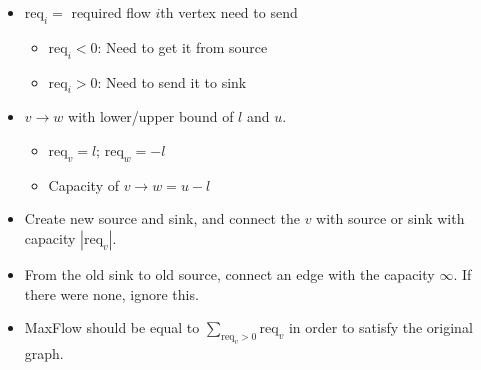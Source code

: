 \begin{itemize}
	\item $\mathrm{req}_i = $ required flow $i$th vertex need to send
	\begin{itemize}
		\item $\mathrm{req}_i < 0$: Need to get it from source
		\item $\mathrm{req}_i > 0$: Need to send it to sink
	\end{itemize}
	\item $v \rightarrow w$ with lower/upper bound of $l$ and $u$.
	\begin{itemize}
		\item $\mathrm{req}_v = l$; $\mathrm{req}_w = -l$
		\item Capacity of $v \rightarrow w = u-l$
	\end{itemize}
	\item Create new source and sink, and connect the $v$ with source or sink with capacity $|\mathrm{req}_v|$.
	\item From the old sink to old source, connect an edge with the capacity $\infty$. If there were none, ignore this.
	\item MaxFlow should be equal to $\sum\limits_{\mathrm{req}_v > 0} \mathrm{req}_v$ in order to satisfy the original graph.
\end{itemize}